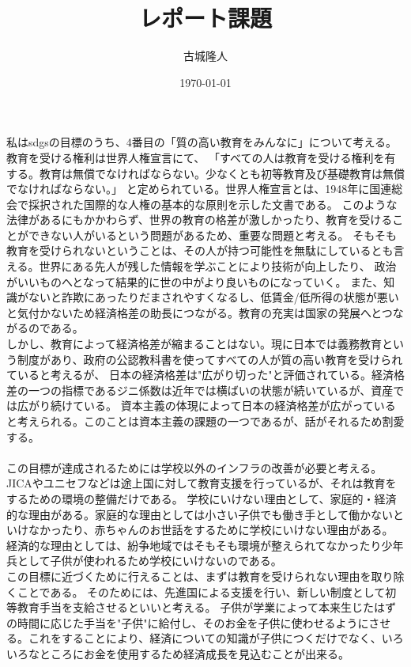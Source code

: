 \documentclass[a4paper,11pt]{jsarticle}
\begin{document}
\title{レポート課題}
\author{古城隆人}
\date{\today}
\maketitle

\newpage
私はsdgsの目標のうち、4番目の「質の高い教育をみんなに」について考える。
教育を受ける権利は世界人権宣言にて、
「すべての人は教育を受ける権利を有する。教育は無償でなければならない。少なくとも初等教育及び基礎教育は無償でなければならない。」\cite{zinken}
と定められている。世界人権宣言とは、1948年に国連総会で採択された国際的な人権の基本的な原則を示した文書である。
このような法律があるにもかかわらず、世界の教育の格差が激しかったり、教育を受けることができない人がいるという問題があるため、重要な問題と考える。
そもそも教育を受けられないということは、その人が持つ可能性を無駄にしているとも言える。世界にある先人が残した情報を学ぶことにより技術が向上したり、
政治がいいものへとなって結果的に世の中がより良いものになっていく。
また、知識がないと詐欺にあったりだまされやすくなるし、低賃金/低所得の状態が悪いと気付かないため経済格差の助長につながる。教育の充実は国家の発展へとつながるのである。\\
しかし、教育によって経済格差が縮まることはない。現に日本では義務教育という制度があり、政府の公認教科書を使ってすべての人が質の高い教育を受けられていると考えるが、
日本の経済格差は"広がり切った"と評価されている。経済格差の一つの指標であるジニ係数は近年では横ばいの状態が続いているが、資産では広がり続けている。
資本主義の体現によって日本の経済格差が広がっていると考えられる。このことは資本主義の課題の一つであるが、話がそれるため割愛する。\\
\\
この目標が達成されるためには学校以外のインフラの改善が必要と考える。JICAやユニセフなどは途上国に対して教育支援を行っているが、それは教育をするための環境の整備だけである。
学校にいけない理由として、家庭的・経済的な理由がある。家庭的な理由としては小さい子供でも働き手として働かないといけなかったり、赤ちゃんのお世話をするために学校にいけない理由がある。
経済的な理由としては、紛争地域ではそもそも環境が整えられてなかったり少年兵として子供が使われるため学校にいけないのである。\\
この目標に近づくために行えることは、まずは教育を受けられない理由を取り除くことである。
そのためには、先進国による支援を行い、新しい制度として初等教育手当を支給させるといいと考える。
子供が学業によって本来生じたはずの時間に応じた手当を"子供"に給付し、そのお金を子供に使わせるようにさせる。これをすることにより、経済についての知識が子供につくだけでなく、いろいろなところにお金を使用するため経済成長を見込むことが出来る。
\end{document}
